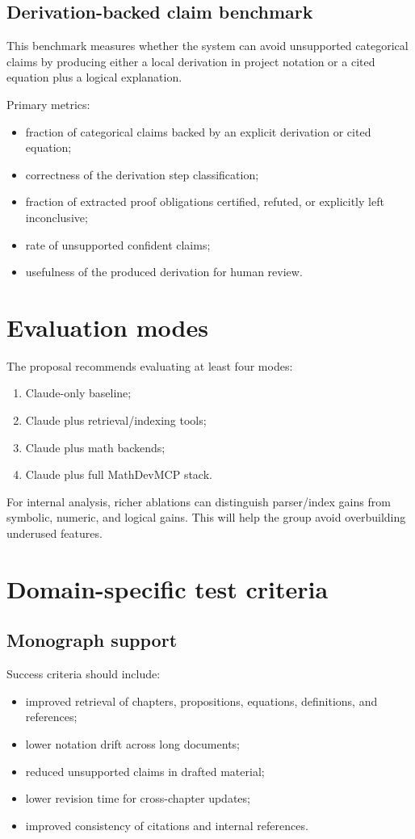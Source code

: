\subsection{Derivation-backed claim benchmark}
This benchmark measures whether the system can avoid unsupported categorical claims by producing either a local derivation in project notation or a cited equation plus a logical explanation.

Primary metrics:
\begin{itemize}
  \item fraction of categorical claims backed by an explicit derivation or cited equation;
  \item correctness of the derivation step classification;
  \item fraction of extracted proof obligations certified, refuted, or explicitly left inconclusive;
  \item rate of unsupported confident claims;
  \item usefulness of the produced derivation for human review.
\end{itemize}


\section{Evaluation modes}

The proposal recommends evaluating at least four modes:
\begin{enumerate}[label=\arabic*.]
  \item Claude-only baseline;
  \item Claude plus retrieval/indexing tools;
  \item Claude plus math backends;
  \item Claude plus full MathDevMCP stack.
\end{enumerate}

For internal analysis, richer ablations can distinguish parser/index gains from symbolic, numeric, and logical gains. This will help the group avoid overbuilding underused features.

\section{Domain-specific test criteria}

\subsection{Monograph support}
Success criteria should include:
\begin{itemize}
  \item improved retrieval of chapters, propositions, equations, definitions, and references;
  \item lower notation drift across long documents;
  \item reduced unsupported claims in drafted material;
  \item lower revision time for cross-chapter updates;
  \item improved consistency of citations and internal references.
\end{itemize}

